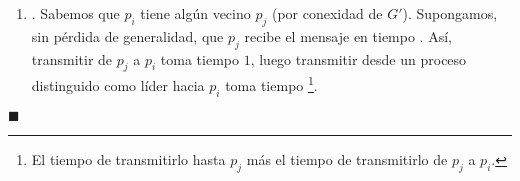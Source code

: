 \begin{itemize}
\begin{enumerate}
      \item {}. Sabemos que $p_i$ tiene algún
      vecino $p_j$ (por conexidad de $G'$). Supongamos, sin pérdida de
      generalidad, que $p_j$ recibe el mensaje  en tiempo .
      Así, transmitir  de $p_j$ a $p_i$ toma tiempo $1$, luego
      transmitir  desde un proceso distinguido como líder hacia
      $p_i$ toma tiempo \footnote{El tiempo de transmitirlo
      hasta $p_j$ más el tiempo de transmitirlo de $p_j$ a $p_i$.}.
      \end{enumerate}
      \hfill $\blacksquare$
\end{itemize}
